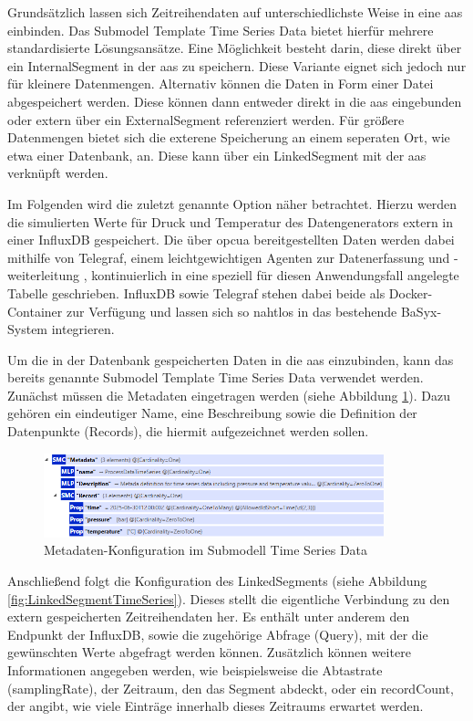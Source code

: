 Grundsätzlich lassen sich Zeitreihendaten auf unterschiedlichste Weise in eine \acs{aas} einbinden.
Das Submodel Template Time Series Data \cite{SpezifikationTimeSeriesData} bietet hierfür mehrere standardisierte Lösungsansätze.
Eine Möglichkeit besteht darin, diese direkt über ein InternalSegment in der \acs{aas} zu speichern.
Diese Variante eignet sich jedoch nur für kleinere Datenmengen.
Alternativ können die Daten in Form einer Datei abgespeichert werden.
Diese können dann entweder direkt in die \acs{aas} eingebunden oder extern über ein ExternalSegment referenziert werden.
Für größere Datenmengen bietet sich die exterene Speicherung an einem seperaten Ort, wie etwa einer Datenbank, an.
Diese kann über ein LinkedSegment mit der \acs{aas} verknüpft werden.

Im Folgenden wird die zuletzt genannte Option näher betrachtet.
Hierzu werden die simulierten Werte für Druck und Temperatur des Datengenerators extern in einer InfluxDB gespeichert.
Die über \acs{opcua} bereitgestellten Daten werden dabei mithilfe von Telegraf, einem leichtgewichtigen Agenten zur Datenerfassung und -weiterleitung \cite{Influx}, kontinuierlich in eine speziell für diesen Anwendungsfall angelegte Tabelle geschrieben.
InfluxDB sowie Telegraf stehen dabei beide als Docker-Container zur Verfügung und lassen sich so nahtlos in das bestehende BaSyx-System integrieren.

Um die in der Datenbank gespeicherten Daten in die \acs{aas} einzubinden, kann das bereits genannte Submodel Template Time Series Data verwendet werden.
Zunächst müssen die Metadaten eingetragen werden (siehe Abbildung \ref{fig:MetadataTimeSeries}).
Dazu gehören ein eindeutiger Name, eine Beschreibung sowie die Definition der Datenpunkte (Records), die hiermit aufgezeichnet werden sollen.

\begin{figure}[htbp]
    \centering
    \includegraphics[width=0.88\textwidth]{Bilder/TimeSeries/MetadataTimeSeries.PNG}
    \caption{Metadaten-Konfiguration im Submodell Time Series Data}
    \label{fig:MetadataTimeSeries}
\end{figure}

Anschließend folgt die Konfiguration des LinkedSegments (siehe Abbildung \ref{fig:LinkedSegmentTimeSeries}). 
Dieses stellt die eigentliche Verbindung zu den extern gespeicherten Zeitreihendaten her.
Es enthält unter anderem den Endpunkt der InfluxDB, sowie die zugehörige Abfrage (Query), mit der die gewünschten Werte abgefragt werden können.
Zusätzlich können weitere Informationen angegeben werden, wie beispielsweise die Abtastrate (samplingRate), der Zeitraum, den das Segment abdeckt, oder ein recordCount, der angibt, wie viele Einträge innerhalb dieses Zeitraums erwartet werden.

